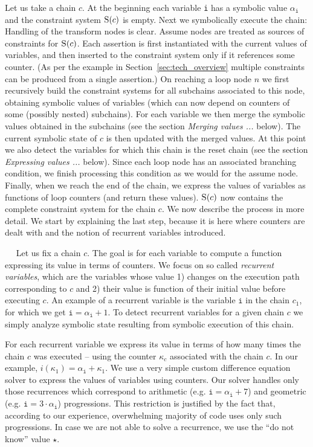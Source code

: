 \documentclass{llncs}
\renewcommand{\paragraph}[1]{\vspace{0.2cm}\noindent{\bf #1}~~}
\begin{document}
Let us take a chain $c$. At the beginning
each variable \texttt{i} has a symbolic value $\alpha_\mathtt{i}$ and the
constraint system $\textsc{S}(c)$ is empty. Next we 
symbolically execute the chain: Handling of the transform nodes is
clear. Assume nodes are treated as sources of constraints for $\textsc{S}(c)$.  Each assertion
is first instantiated with the current  values of variables, and
then inserted to the constraint system only if it references some
counter. (As per the example in Section~\ref{sec:tech_overview} multiple
constraints can be produced from a single assertion.)  On reaching a loop
node $n$ we first recursively build the constraint systems for all subchains associated
to this node, obtaining symbolic values of variables (which can now depend
on counters of some (possibly nested) subchains). For each
variable we then merge the symbolic values obtained in the
subchains (see the section \emph{Merging values ...} below). The current
symbolic state of $c$ is then updated with the merged values.
At this point we also detect the variables for which this chain is the reset
chain (see the section \emph{Expressing values ...} below).
Since each loop node has an associated branching condition, we finish
processing this condition as we would for the assume node. Finally, when we
reach the end of the chain, we express the values of variables as
functions of loop counters (and return these values). $\textsc{S}(c)$ now contains the complete constraint
system for the chain $c$.
We now describe the process in more detail. We start by explaining the last
step, because it is here where counters are dealt with and the notion of
recurrent variables introduced.

\paragraph{Expressing values using counters}
Let us fix a chain $c$. The goal is for each variable to compute a function expressing
its value in terms of counters. 
We focus on so called \emph{recurrent variables}, which are the variables
whose value 1) changes on the execution path corresponding to $c$ and 2)
their value is function of their initial value before executing $c$. An
example of a recurrent variable is the variable $\mathtt{i}$ in the chain
$c_1$, for which we get $\mathtt{i}=\alpha_\mathtt{i}+1$. To detect
recurrent variables for a given chain $c$ we simply analyze symbolic state
resulting from symbolic execution of this chain.

For each recurrent variable we express its value in terms of how many
times the chain $c$ was executed -- using the counter $\kappa_c$ associated
with the chain $c$. In our example,
$i(\kappa_1)=\alpha_\mathtt{i}+\kappa_1$.  We use a very simple custom difference
equation solver to express the values of variables using counters. 
Our solver handles only those recurrences which
correspond to arithmetic (e.g. $\mathtt{i}=\alpha_\mathtt{i}+7$) and geometric
(e.g. $\mathtt{i}=3\cdot\alpha_\mathtt{i}$) progressions. This restriction is
justified by the fact that, according to our experience, overwhelming
majority of code uses only such progressions. In case we are not able to
solve a recurrence, we use the ``do not know'' value $\star$. 
 
\end{document}
